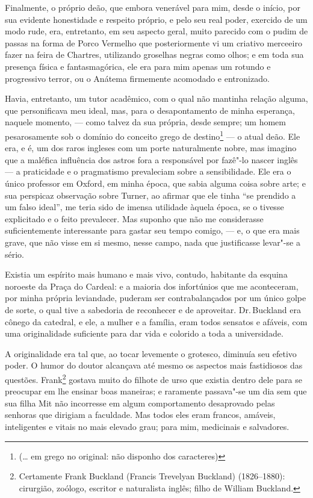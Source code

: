 Finalmente, o próprio deão, que embora venerável para mim, desde o
início, por sua evidente honestidade e respeito próprio, e pelo seu real
poder, exercido de um modo rude, era, entretanto, em seu aspecto geral,
muito parecido com o pudim de passas na forma de Porco Vermelho que
posteriormente vi um criativo merceeiro fazer na feira de Chartres,
utilizando groselhas negras como olhos; e em toda sua presença física e
fantasmagórica, ele era para mim apenas um rotundo e progressivo terror,
ou o Anátema firmemente acomodado e entronizado.

Havia, entretanto, um tutor acadêmico, com o qual não mantinha relação
alguma, que personificava meu ideal, mas, para o desapontamento de minha
esperança, naquele momento, --- como talvez da sua própria, desde sempre;
um homem pesarosamente sob o domínio do conceito grego de
destino\footnote{(\ldots{} em grego no original: não disponho dos
caracteres)}  --- o atual deão. Ele era, e é, um dos raros ingleses com um
porte naturalmente nobre, mas imagino que a maléfica influência dos
astros fora a responsável por fazê"-lo nascer inglês --- a praticidade e o
pragmatismo prevaleciam sobre a sensibilidade. Ele era o único professor
em Oxford, em minha época, que sabia alguma coisa sobre arte; e sua
perspicaz observação sobre Turner, ao afirmar que ele tinha ``se
prendido a um falso ideal'', me teria sido de imensa utilidade àquela
época, se o tivesse explicitado e o feito prevalecer. Mas suponho que
não me considerasse suficientemente interessante para gastar seu tempo
comigo, --- e, o que era mais grave, que não visse em si mesmo, nesse
campo, nada que justificasse levar"-se a sério.

Existia um espírito mais humano e mais vivo, contudo, habitante da
esquina noroeste da Praça do Cardeal: e a maioria dos infortúnios que me
aconteceram, por minha própria leviandade, puderam ser contrabalançados
por um único golpe de sorte, o qual tive a sabedoria de reconhecer e de
aproveitar. Dr.\,Buckland era cônego da catedral, e ele, a mulher e a
família, eram todos sensatos e afáveis, com uma originalidade suficiente
para dar vida e colorido a toda a universidade.

A originalidade era tal que, ao tocar levemente o grotesco, diminuía seu
efetivo poder. O humor do doutor alcançava até mesmo os aspectos mais
fastidiosos das questões. Frank\footnote{Certamente Frank Buckland
  (Francis Trevelyan Buckland) (1826--1880): cirurgião, zoólogo, escritor
  e naturalista inglês; filho de William Buckland.}
gostava muito do filhote de urso que existia dentro dele para se
preocupar em lhe ensinar boas maneiras; e raramente passava"-se um dia
sem que sua filha Mit não incorresse em algum comportamento desaprovado
pelas senhoras que dirigiam a faculdade. Mas todos eles eram francos,
amáveis, inteligentes e vitais no mais elevado grau; para mim,
medicinais e salvadores.

